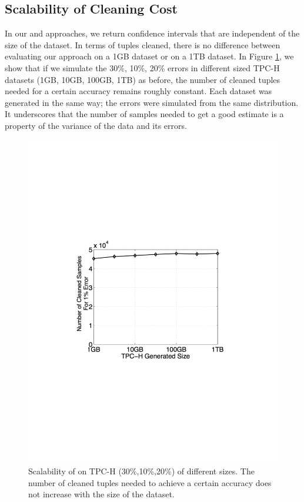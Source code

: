 \subsection{Scalability of Cleaning Cost}

In our \sampleclean and \bias approaches, we return confidence intervals that are independent of the size of the dataset.
In terms of tuples cleaned, there is no difference between evaluating our approach on a 1GB dataset or on a 1TB dataset.
In Figure \ref{exp:scalability-size}, we show that if we simulate the 30\%, 10\%, 20\% errors in different sized TPC-H datasets (1GB, 10GB, 100GB, 1TB) as before, the number of cleaned tuples needed for a certain accuracy remains roughly constant.
Each dataset was generated in the same way; the errors were simulated from the same distribution.
It underscores that the number of samples needed to get a good estimate is a property of the variance of the data and its errors.

\begin{figure}[h]\vspace{-.5em}
\centering
\includegraphics[scale=.4]{exp/scalability-size-cleaning.pdf}\vspace{-1em}
\caption{Scalability of \saqpplus on TPC-H (30\%,10\%,20\%) of different sizes. The number of cleaned tuples needed to achieve a certain accuracy does not increase with the size of the dataset.}\vspace{-.5em}
\label{exp:scalability-size}
\end{figure}

